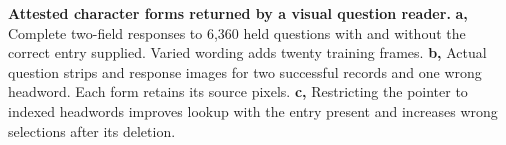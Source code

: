 \textbf{Attested character forms returned by a visual question reader.} \textbf{a,} Complete two-field responses to 6,360 held questions with and without the correct entry supplied. Varied wording adds twenty training frames. \textbf{b,} Actual question strips and response images for two successful records and one wrong headword. Each form retains its source pixels. \textbf{c,} Restricting the pointer to indexed headwords improves lookup with the entry present and increases wrong selections after its deletion.
